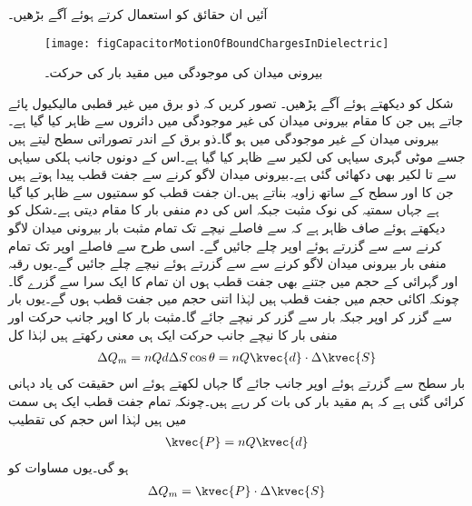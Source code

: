 آئیں ان حقائق کو استعمال کرتے ہوئے آگے بڑھیں۔
\begin{figure}
\centering
\texttt{[image: figCapacitorMotionOfBoundChargesInDielectric]}
\caption{بیرونی میدان کی موجودگی میں مقید بار کی حرکت۔}
\label{شکل_کپیسٹر_مقید_بار_حرکت}
\end{figure}

شکل   کو دیکھتے ہوئے آگے پڑھیں۔ تصور کریں کہ ذو برق میں غیر قطبی مالیکیول پائے جاتے ہیں جن کا مقام بیرونی میدان کی غیر موجودگی میں دائروں سے ظاہر کیا گیا ہے۔بیرونی میدان کے غیر موجودگی میں  ہو گا۔ذو برق کے اندر تصوراتی سطح  لیتے ہیں جسے موٹی گہری سیاہی کی لکیر سے ظاہر کیا گیا ہے۔اس کے دونوں جانب ہلکی سیاہی سے  تا  لکیر بھی دکھائی گئی ہے۔بیرونی میدان لاگو کرنے سے  جفت قطب  پیدا ہوتے ہیں  جن کا  اور  سطح   کے ساتھ  زاویہ بناتے ہیں۔ان جفت قطب کو سمتیوں سے ظاہر کیا گیا ہے جہاں سمتیہ کی نوک مثبت جبکہ اس کی دم منفی بار کا مقام دیتی ہے۔شکل کو دیکھتے ہوئے صاف ظاہر ہے  کہ  سے  فاصلے نیچے  تک تمام مثبت بار بیرونی میدان لاگو کرنے سے   سے گزرتے ہوئے  اوپر چلے جائیں گے۔ اسی طرح  سے  فاصلے اوپر  تک تمام منفی بار بیرونی میدان لاگو کرنے سے   سے گزرتے ہوئے  نیچے چلے جائیں گے۔یوں  رقبہ اور  گہرائی کے حجم  میں جتنے بھی جفت قطب ہوں ان تمام کا ایک سرا  سے گزرے گا۔چونکہ اکائی حجم میں  جفت قطب ہیں لہٰذا اتنی حجم میں  جفت قطب ہوں گے۔یوں  بار  سے گزر کر اوپر  جبکہ  بار  سے گزر کر نیچے جائے گا۔مثبت بار کا اوپر جانب حرکت اور منفی بار کا نیچے جانب حرکت ایک ہی معنی رکھتے ہیں لہٰذا  کل 
\begin{align}\label{مساوات_کپیسٹر_مقید_بار_الف}
\Delta Q_m=nQd \Delta S \cos \theta=n Q  \kvec{d} \cdot \Delta \kvec{S}
\end{align}
بار سطح سے گزرتے ہوئے اوپر جانب جائے گا جہاں  لکھتے ہوئے اس حقیقت کی یاد دہانی کرائی گئی ہے کہ ہم مقید بار کی بات کر رہے ہیں۔چونکہ تمام جفت قطب ایک ہی سمت میں ہیں لہٰذا اس حجم کی تقطیب
\begin{align}
\kvec{P}=nQ\kvec{d}
\end{align}
ہو گی۔یوں مساوات  کو
\begin{align}\label{مساوات_کپیسٹر_مقید_بار_ب}
\Delta Q_m=\kvec{P} \cdot \Delta \kvec{S}
\end{align}
